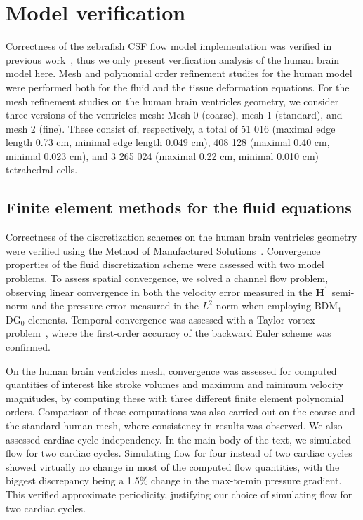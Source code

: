 \documentclass{template}
\begin{document}
{}

\newpage
\appendix

\section{Model verification}
Correctness of the zebrafish CSF flow model implementation
was verified in previous work~\citep{Herlyng2025AdvectionDiffusion},
thus we only present verification analysis of the human brain model here.
Mesh and polynomial order refinement studies for the human
model were performed both for the fluid and the tissue deformation equations.
For the mesh refinement studies on the human brain ventricles geometry,
we consider three versions of the ventricles mesh: Mesh 0 (coarse),
mesh 1 (standard), and mesh 2 (fine). These consist of, respectively,
a total of 51 016 (maximal edge length 0.73 cm, minimal edge length 0.049 cm),
408 128 (maximal 0.40 cm, minimal 0.023 cm),
and 3 265 024 (maximal 0.22 cm, minimal 0.010 cm) tetrahedral cells.

\subsection{Finite element methods for the fluid equations}\label{sec:flow_model_verification}
Correctness of the discretization schemes on the human brain ventricles geometry
were verified using the Method of Manufactured Solutions~\citep{Roache2001CodeSolutions}.
Convergence properties of the fluid discretization scheme were assessed with two
model problems. To assess spatial convergence, we solved a channel flow
problem, observing linear convergence in both the velocity error measured
in the $\bm{H}^1$ semi-norm and the pressure error measured in the $L^2$ norm
when employing $\mathrm{BDM}_1$--$\mathrm{DG}_0$ elements.
Temporal convergence was assessed with a Taylor vortex
problem~\citep{Karniadakis2005Verification}, where the first-order
accuracy of the backward Euler scheme was confirmed.

On the human brain ventricles mesh, convergence was assessed for computed quantities
of interest like stroke volumes and maximum and minimum velocity
magnitudes, by computing these with three different finite element
polynomial orders. Comparison of these computations was also
carried out on the coarse and the standard human mesh,
where consistency in results was observed.
We also assessed cardiac cycle independency. In the main body of the text,
we simulated flow for two cardiac cycles. Simulating flow for four instead of two
cardiac cycles showed virtually no change in most of the computed flow
quantities, with the biggest discrepancy being a 1.5\% change in the max-to-min pressure
gradient. This verified approximate periodicity,
justifying our choice of simulating flow for two cardiac cycles.
\end{document}
